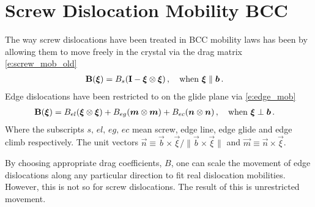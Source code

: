 \chapter{Screw Dislocation Mobility BCC}
The way screw dislocations have been treated in BCC mobility laws has been by allowing them to move freely in the crystal via the drag matrix \cref{e:screw_mob_old}
\begin{align}\label{e:screw_mob_old}
	\mtx{B}(\vec{\xi}) &= B_{s}(\mtx{I} - \vec{\xi} \otimes \vec{\xi})\,,\quad \textrm{when } \vec{\xi} \parallel \vec{b}\,.
\end{align}
Edge dislocations have been restricted to on the glide plane via \cref{e:edge_mob}
\begin{align}\label{e:edge_mob}
	\mtx{B}(\vec{\xi}) &= B_{el} (\vec{\xi} \otimes \vec{\xi}) + B_{eg} (\vec{m} \otimes \vec{m}) + B_{ec} (\vec{n} \otimes \vec{n})\,, \quad \textrm{when } \vec{\xi} \perp \vec{b}\,.
\end{align}
Where the subscripts $s,\, el,\, eg,\,e c$ mean screw, edge line, edge glide and edge climb respectively. The unit vectors $ \vec{n} \equiv \vec{b} \times \vec{\xi} / \lVert \vec{b} \times \vec{\xi} \rVert $ and $ \vec{m} \equiv \vec{n} \times \vec{\xi}$.

By choosing appropriate drag coefficients, $B$, one can scale the movement of edge dislocations along any particular direction to fit real dislocation mobilities. However, this is not so for screw dislocations. The result of this is unrestricted movement.


